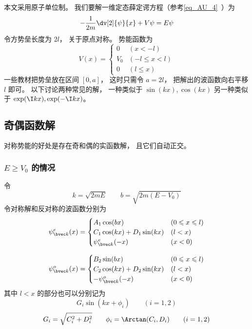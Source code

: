 


本文采用原子单位制。 我们要解一维定态薛定谔方程（参考\autoref{eq_AU_4}~）为
\begin{equation}
-\frac{1}{2m} \dv[2]{\psi}{x} + V\psi= E \psi
\end{equation}
令方势垒长度为 $2l$， 关于原点对称。 势能函数为
\begin{equation}
V(x) =
\begin{cases}
0 & (x < -l)\\
V_0 & (-l \leqslant x < l)\\
0 & (l \leqslant x)
\end{cases}
\end{equation}
一些教材把势垒放在区间 $[0, a]$， 这时只需令 $a = 2l$， 把解出的波函数向右平移 $l$ 即可。 以下讨论两种常见的解， 一种类似于 $\sin(kx), \cos(kx)$ 另一种类似于 $\exp(\I kx), \exp(-\I kx)$。

\subsection{奇偶函数解}
对称势能的好处是存在奇和偶的实函数解， 且它们自动正交。
\subsubsection{$E \ge V_0$ 的情况}
令
\begin{equation}
k = \sqrt{2mE}
\qquad
b = \sqrt{2m(E-V_0)}
\end{equation}
令对称解和反对称的波函数分别为
\begin{equation}
\psi_{\bvec k}^e(x) =
\begin{cases}
A_1 \cos(bx) & (0 \leqslant x \leqslant l)\\
C_1 \cos(kx) + D_1 \sin(kx) & (l < x)\\
\psi_{\bvec k}^e(-x) & (x < 0)
\end{cases}
\end{equation}

\begin{equation}
\psi_{\bvec k}^o(x) =
\begin{cases}
B_2 \sin(bx) & (0 \leqslant x \leqslant l)\\
C_2 \cos(kx) + D_2 \sin(kx) & (l < x)\\
-\psi_{\bvec k}^o(-x) & (x < 0)
\end{cases}
\end{equation}
其中 $l < x$ 的部分也可以分别记为
\begin{equation}
G_i \sin(kx + \phi_i) \qquad (i = 1,2)
\end{equation}
\begin{equation}
G_i = \sqrt{C_i^2 + D_i^2}
\qquad
\phi_i = \Arctan(C_i, D_i)
\qquad
(i = 1,2)
\end{equation}


